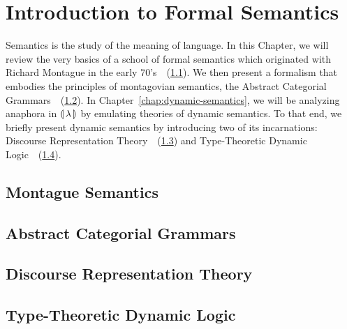 \chapter{Introduction to Formal Semantics}
\label{chap:intro-fs}

Semantics is the study of the meaning of language. In this Chapter, we will
review the very basics of a school of formal semantics which originated
with Richard Montague in the early
70's~\cite{montague1970english,montague1970universal,montague1973proper}~(\ref{sec:montague}). We
then present a formalism that embodies the principles of montagovian
semantics, the Abstract Categorial
Grammars~\cite{de2001towards}~(\ref{sec:acg}). In
Chapter~\ref{chap:dynamic-semantics}, we will be analyzing anaphora in
${\llparenthesis \, \lambda \, \rrparenthesis}$ by emulating theories of dynamic semantics. To that end, we briefly
present dynamic semantics by introducing two of its incarnations: Discourse
Representation Theory~\cite{kamp1993discourse}~(\ref{sec:drt}) and
Type-Theoretic Dynamic Logic~\cite{de2006towards}~(\ref{sec:ttdl}).

\minitoc


\section{Montague Semantics}
\label{sec:montague}




\section{Abstract Categorial Grammars}
\label{sec:acg}




\section{Discourse Representation Theory}
\label{sec:drt}




\section{Type-Theoretic Dynamic Logic}
\label{sec:ttdl}
